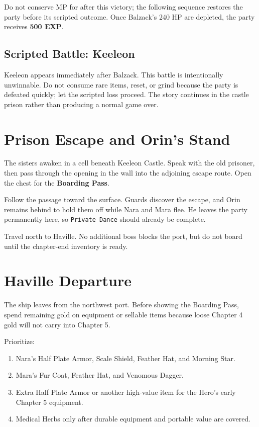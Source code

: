\documentclass[
  american,
  10pt,
  letterpaper,
  oneside,
  open=any]{scrreprt}
\providecommand{\tightlist}{%
  \setlength{\itemsep}{0pt}\setlength{\parskip}{0pt}}
\begin{document}
Do not conserve MP for after this victory; the following sequence
restores the party before its scripted outcome. Once Balzack's 240 HP
are depleted, the party receives \textbf{500 EXP}.

\subsection{Scripted Battle: Keeleon}\label{scripted-battle-keeleon}

Keeleon appears immediately after Balzack. This battle is intentionally
unwinnable. Do not consume rare items, reset, or grind because the party
is defeated quickly; let the scripted loss proceed. The story continues
in the castle prison rather than producing a normal game over.

\section{Prison Escape and Orin's
Stand}\label{prison-escape-and-orins-stand}

The sisters awaken in a cell beneath Keeleon Castle. Speak with the old
prisoner, then pass through the opening in the wall into the adjoining
escape route. Open the chest for the \textbf{Boarding Pass}.

Follow the passage toward the surface. Guards discover the escape, and
Orin remains behind to hold them off while Nara and Mara flee. He leaves
the party permanently here, so \texttt{Private\ Dance} should already be
complete.

Travel north to Haville. No additional boss blocks the port, but do not
board until the chapter-end inventory is ready.

\section{Haville Departure}\label{haville-departure}

The ship leaves from the northwest port. Before showing the Boarding
Pass, spend remaining gold on equipment or sellable items because loose
Chapter 4 gold will not carry into Chapter 5.

Prioritize:

\begin{enumerate}
\def\labelenumi{\arabic{enumi}.}
\tightlist
\item
  Nara's Half Plate Armor, Scale Shield, Feather Hat, and Morning Star.
\item
  Mara's Fur Coat, Feather Hat, and Venomous Dagger.
\item
  Extra Half Plate Armor or another high-value item for the Hero's early
  Chapter 5 equipment.
\item
  Medical Herbs only after durable equipment and portable value are
  covered.
\end{enumerate}
\end{document}
